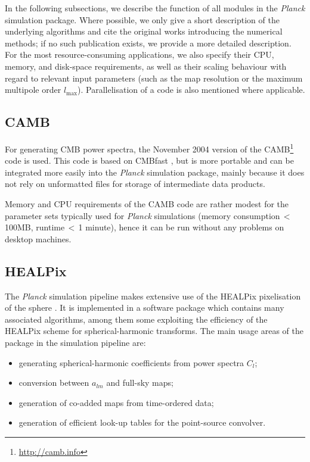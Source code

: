 \documentclass{aa}
\begin{document}
In the following subsections, we describe the function of all
modules in the \emph{Planck} simulation package. Where possible, we
only give a short description of the underlying algorithms and cite
the original works introducing the numerical methods; if no such
publication exists, we provide a more detailed description. For the
most resource-consuming applications, we also specify their CPU, memory,
and disk-space requirements, as well as their scaling behaviour with
regard to relevant input parameters (such as the map resolution or the
maximum multipole order $l_\text{max}$). Parallelisation of a code
is also mentioned where applicable.

\subsection {CAMB}
\label{camb}

For generating CMB power spectra, the November 2004 version of the
CAMB\footnote{\href{http://camb.info}{http://camb.info}} code
\citep{lewis-etal-2000} is used. This code is based on CMBfast
\citep{seljak-zaldarriaga-1996}, but is more portable and can be integrated
more easily into the \emph{Planck} simulation package, mainly
because it does not rely on unformatted files for storage of
intermediate data products.

Memory and CPU requirements of the CAMB code are rather modest for the
parameter sets typically used for \emph{Planck} simulations
(memory consumption\,$<$\,100MB, runtime\,$<$\,1 minute), hence it
can be run without any problems on desktop machines.

\subsection {HEALPix}
\label{healpix}

The \emph{Planck} simulation pipeline makes extensive use of the
HEALPix pixelisation of the sphere
\citep{gorski-etal-2002,gorski-etal-2005}. It is implemented in a
software package which contains many associated algorithms, among
them some exploiting the efficiency of the HEALPix scheme for
spherical-harmonic transforms. The main usage areas of the package
in the simulation pipeline are:
\begin{itemize}
  \item generating spherical-harmonic coefficients from power spectra $C_l$;
  \item conversion between $a_{lm}$ and full-sky maps;
  \item generation of co-added maps from time-ordered data;
  \item generation of efficient look-up tables for the point-source
    convolver.
\end {itemize}
\end{document}
